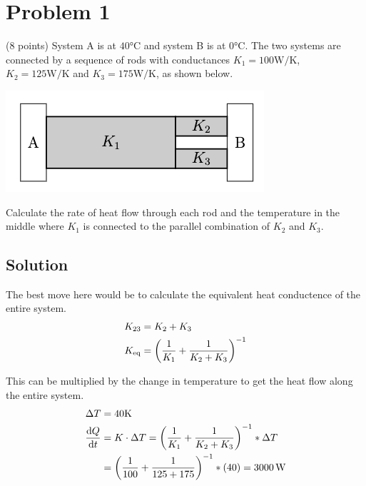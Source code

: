 \documentclass[12pt]{article}
\begin{document}

    \section{Problem 1}
        (8 points) System A is at $40\unit{\celsius}$ and system B is at $0\unit{\celsius}$. 
        The two systems are connected by a sequence of rods with conductances $K_1 = 100 \unit{\watt/\kelvin}$, $K_2 = 125 \unit{\watt/\kelvin}$ and $K_3 = 175 \unit{\watt/\kelvin}$, as shown below.
        \begin{center}
            \includegraphics{picture_1.png}
        \end{center}

        Calculate the rate of heat ﬂow through each rod and the temperature in the middle where $K_1$ is connected to the parallel combination of $K_2$ and $K_3$.

        \subsection{Solution}
            The best move here would be to calculate the equivalent heat conductence of the entire system.
            \begin{align}
                K_{23}  &=  K_2 + K_3\\
                K_{\rm eq}  &=  \left( \frac{1}{K_1} + \frac{1}{K_2 + K_3} \right)^{-1}
            \end{align}

            This can be multiplied by the change in temperature to get the heat flow along the entire system.
            \begin{align}
                \Delta T    &=  40\unit{\kelvin}\\
                \dv{Q}{t}   &=  K \cdot \Delta T
                    =   \left( \frac{1}{K_1} + \frac{1}{K_2 + K_3} \right)^{-1} * \Delta T\\
                    &=  \left( \frac{1}{100} + \frac{1}{125 + 175} \right)^{-1} * (40)
                    =   3000\,\unit{\watt}
            \end{align}
\end{document}
